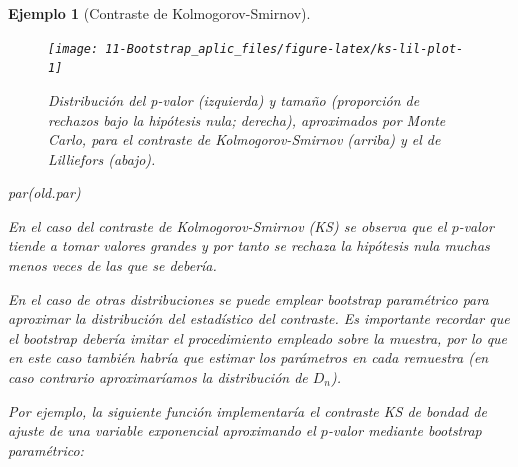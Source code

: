 \documentclass[
]{book}
\newenvironment{Shaded}{\begin{snugshade}}{\end{snugshade}}
\newcommand{\FunctionTok}[1]{\textcolor[rgb]{0.00,0.00,0.00}{#1}}
\newcommand{\NormalTok}[1]{#1}
\theoremstyle{break}
\newtheorem{example}{Ejemplo}[chapter]
\theoremstyle{nonumberplain}
\begin{document}
\begin{example}[Contraste de Kolmogorov-Smirnov]
\begin{figure}[!htb]

{\centering \texttt{[image: 11-Bootstrap\_aplic\_files/figure-latex/ks-lil-plot-1]} 

}

\caption{Distribución del p-valor (izquierda) y tamaño (proporción de rechazos bajo la hipótesis nula; derecha), aproximados por Monte Carlo, para el contraste de Kolmogorov-Smirnov (arriba) y el de Lilliefors (abajo).}\label{fig:ks-lil-plot}
\end{figure}

\begin{Shaded}
\begin{Highlighting}[]
\FunctionTok{par}\NormalTok{(old.par)}
\end{Highlighting}
\end{Shaded}

En el caso del contraste de Kolmogorov-Smirnov (KS) se observa que el \(p\)-valor
tiende a tomar valores grandes y por tanto se rechaza la hipótesis nula
muchas menos veces de las que se debería.

En el caso de otras distribuciones se puede emplear bootstrap paramétrico para
aproximar la distribución del estadístico del contraste.
Es importante recordar que el bootstrap debería imitar el procedimiento
empleado sobre la muestra, por lo que en este caso también habría que estimar
los parámetros en cada remuestra
(en caso contrario aproximaríamos la distribución de \(D_n\)).

Por ejemplo, la siguiente función implementaría el contraste KS de
bondad de ajuste de una variable exponencial aproximando el
\(p\)-valor mediante bootstrap paramétrico:


\end{example}
\end{document}
